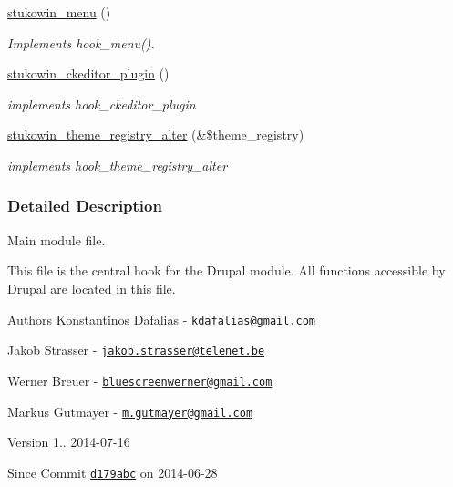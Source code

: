 \begin{DoxyCompactItemize}
\hyperlink{group___stukowin___module_ga59cfbad113b7aa2d10f0b204a5f7ba0d}{stukowin\+\_\+menu} ()
\begin{DoxyCompactList}\small\item\em Implements hook\+\_\+menu(). \end{DoxyCompactList}\item 
\hyperlink{group___drupal2_a_g_g_gae3c906d1ab9c3d8ed245d58c1ebf2a4a}{stukowin\+\_\+ckeditor\+\_\+plugin} ()
\begin{DoxyCompactList}\small\item\em implements hook\+\_\+ckeditor\+\_\+plugin \end{DoxyCompactList}\item 
\hyperlink{group___drupal2_a_g_g_ga3bf2203298453c41bf9a5ec48d3c2de3}{stukowin\+\_\+theme\+\_\+registry\+\_\+alter} (\&\$theme\+\_\+registry)
\begin{DoxyCompactList}\small\item\em implements hook\+\_\+theme\+\_\+registry\+\_\+alter \end{DoxyCompactList}\end{DoxyCompactItemize}


\subsubsection{Detailed Description}
Main module file. 

This file is the central hook for the Drupal module. All functions accessible by Drupal are located in this file.

\begin{DoxyAuthor}{Authors}
Konstantinos Dafalias -\/ \href{mailto:kdafalias@gmail.com}{\tt kdafalias@gmail.\+com} 

Jakob Strasser -\/ \href{mailto:jakob.strasser@telenet.be}{\tt jakob.\+strasser@telenet.\+be} 

Werner Breuer -\/ \href{mailto:bluescreenwerner@gmail.com}{\tt bluescreenwerner@gmail.\+com} 

Markus Gutmayer -\/ \href{mailto:m.gutmayer@gmail.com}{\tt m.\+gutmayer@gmail.\+com} 
\end{DoxyAuthor}
\begin{DoxyVersion}{Version}
1.. 2014-\/07-\/16 
\end{DoxyVersion}
\begin{DoxySince}{Since}
Commit \href{http://github.com/TheJake123/DrupalModul/commit/d179abcc5e05743086cd67cf1ce30b08923a7183}{\tt d179abc} on 2014-\/06-\/28 
\end{DoxySince}


